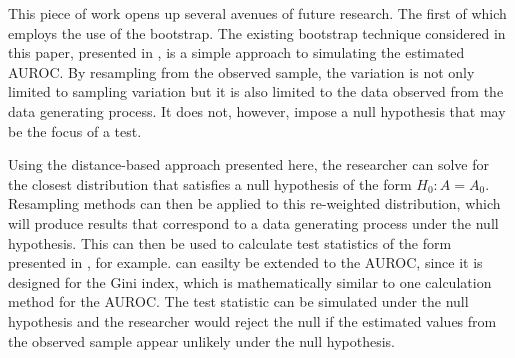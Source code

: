 




This piece of work opens up several avenues of future research.
The first of which employs the use of the bootstrap.
The existing bootstrap technique considered in this paper, presented in \citet{proc2011}, is a simple approach to simulating the estimated AUROC.
By resampling from the observed sample, the variation is not only limited to sampling variation but it is also limited to the data observed from the data generating process.
It does not, however, impose a null hypothesis that may be the focus of a test.

Using the distance-based approach presented here,
the researcher can solve for the closest distribution that satisfies a null hypothesis of the form $H_0: A = A_0$.
Resampling methods can then be applied to this re-weighted distribution, which will produce results that correspond to a data generating process under the null hypothesis.
This can then be used to calculate test statistics of the form presented in \citet{davidson2008}, for example.
\citet{davidson2008} can easilty be extended to the AUROC, since it is designed for the Gini index, which is mathematically similar to one calculation method for the AUROC.
The test statistic can be simulated under the null hypothesis and the researcher would reject the null if the estimated values from the observed sample appear unlikely under the null hypothesis.


